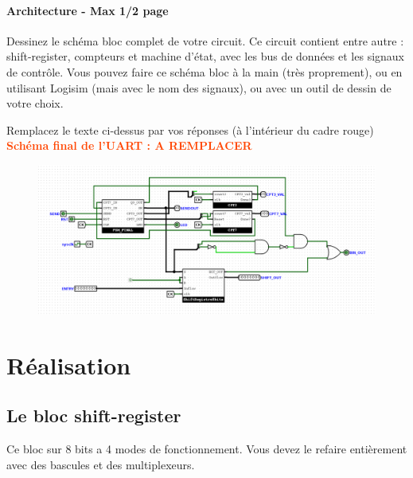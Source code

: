 \documentclass[a4paper]{article} %
\newcommand{\red}[1]{\textbf{\textcolor{OrangeRed}{#1}}}
\begin{document}
\begin{tcolorbox}[colframe=Monokaimagenta,colback=white]
\paragraph{Architecture - Max 1/2 page}
Dessinez le schéma bloc complet de votre circuit. Ce circuit contient entre autre : shift-register, compteurs et machine d’état, avec les bus de données et les signaux de contrôle. Vous pouvez faire ce schéma bloc à la main (très proprement), ou en utilisant Logisim (mais avec le nom des signaux), ou avec un outil de dessin de votre choix.

Remplacez le texte ci-dessus par vos réponses (à l’intérieur du cadre rouge)\\

\red{Schéma final de l'UART : A REMPLACER}\\

\begin{figure}[H]
	\centering
	\includegraphics[width=\textwidth]{src/schema_UART}
	\label{fig:UART}
\end{figure}


\end{tcolorbox}


\section {Réalisation}
\subsection{Le bloc shift-register}
Ce bloc sur 8 bits a 4 modes de fonctionnement. Vous devez le refaire entièrement avec des bascules et des multiplexeurs.
\end{document}
